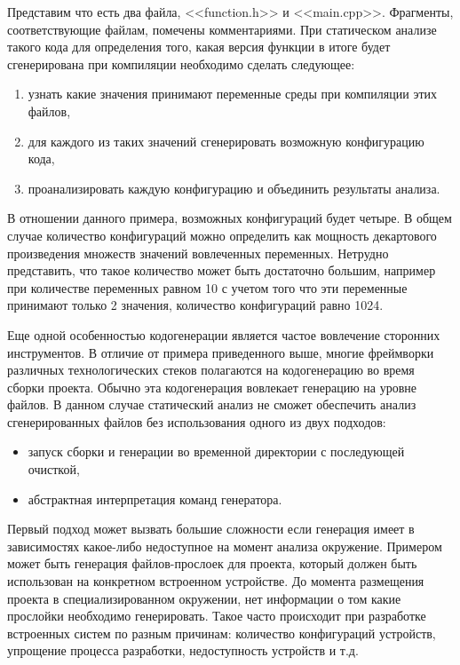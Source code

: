 Представим что есть два файла, <<function.h>> и <<main.cpp>>. Фрагменты, соответствующие файлам, помечены
комментариями. При статическом анализе такого кода для определения того, какая версия функции в итоге будет
сгенерирована при компиляции необходимо сделать следующее:
\begin{enumerate}[label=\arabic*.]
    \item узнать какие значения принимают переменные среды при компиляции этих файлов,
    \item для каждого из таких значений сгенерировать возможную конфигурацию кода,
    \item проанализировать каждую конфигурацию и объединить результаты анализа.
\end{enumerate}
В отношении данного примера, возможных конфигураций будет четыре. В общем случае количество конфигураций
можно определить как мощность декартового произведения множеств значений вовлеченных переменных.
Нетрудно представить, что такое количество может быть достаточно большим, например при количестве переменных
равном 10 с учетом того что эти переменные принимают только 2 значения, количество конфигураций равно 1024.

Еще одной особенностью кодогенерации является частое вовлечение сторонних инструментов. В отличие от
примера приведенного выше, многие фреймворки различных технологических стеков полагаются на кодогенерацию во время
сборки проекта. Обычно эта кодогенерация вовлекает генерацию на уровне файлов. В данном случае статический анализ
не сможет обеспечить анализ сгенерированных файлов без использования одного из двух подходов:
\begin{itemize}
    \item запуск сборки и генерации во временной директории с последующей очисткой,
    \item абстрактная интерпретация команд генератора.
\end{itemize}

Первый подход может вызвать большие сложности если генерация имеет в зависимостях какое-либо
недоступное на момент анализа окружение. Примером может быть генерация файлов-прослоек для проекта,
который должен быть использован на конкретном встроенном устройстве. До момента размещения проекта
в специализированном окружении, нет информации о том какие прослойки необходимо генерировать.
Такое часто происходит при разработке встроенных систем по разным причинам: количество конфигураций
устройств, упрощение процесса разработки, недоступность устройств и т.д.

